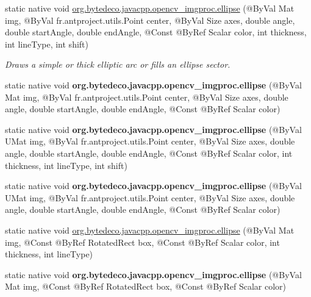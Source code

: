 \begin{DoxyCompactItemize}
\item 
static native void \hyperlink{group__imgproc__draw_ga775ad50d707d4e99bd6f123f702e55a2}{org.\+bytedeco.\+javacpp.\+opencv\+\_\+imgproc.\+ellipse} (@By\+Val Mat img, @By\+Val fr.antproject.utils.Point center, @By\+Val Size axes, double angle, double start\+Angle, double end\+Angle, @Const @By\+Ref Scalar color, int thickness, int line\+Type, int shift)
\begin{DoxyCompactList}\small\item\em Draws a simple or thick elliptic arc or fills an ellipse sector. \end{DoxyCompactList}\item 
\mbox{\label{group__imgproc__draw_gaf55397a8f53b47bedcf99d53034662e1}} 
static native void {\bfseries org.\+bytedeco.\+javacpp.\+opencv\+\_\+imgproc.\+ellipse} (@By\+Val Mat img, @By\+Val fr.antproject.utils.Point center, @By\+Val Size axes, double angle, double start\+Angle, double end\+Angle, @Const @By\+Ref Scalar color)
\item 
\mbox{\label{group__imgproc__draw_gaba0d700bcd539788f3d33f872ddc3fbf}} 
static native void {\bfseries org.\+bytedeco.\+javacpp.\+opencv\+\_\+imgproc.\+ellipse} (@By\+Val U\+Mat img, @By\+Val fr.antproject.utils.Point center, @By\+Val Size axes, double angle, double start\+Angle, double end\+Angle, @Const @By\+Ref Scalar color, int thickness, int line\+Type, int shift)
\item 
\mbox{\label{group__imgproc__draw_ga9a7de14f5273857bcb1023332bfe3178}} 
static native void {\bfseries org.\+bytedeco.\+javacpp.\+opencv\+\_\+imgproc.\+ellipse} (@By\+Val U\+Mat img, @By\+Val fr.antproject.utils.Point center, @By\+Val Size axes, double angle, double start\+Angle, double end\+Angle, @Const @By\+Ref Scalar color)
\item 
static native void \hyperlink{group__imgproc__draw_gad8f98cdfda176a2e4e1560740c6b5adb}{org.\+bytedeco.\+javacpp.\+opencv\+\_\+imgproc.\+ellipse} (@By\+Val Mat img, @Const @By\+Ref Rotated\+Rect box, @Const @By\+Ref Scalar color, int thickness, int line\+Type)
\item 
\mbox{\label{group__imgproc__draw_ga9eba26e909a6b1bff5d442d5fc3a09cf}} 
static native void {\bfseries org.\+bytedeco.\+javacpp.\+opencv\+\_\+imgproc.\+ellipse} (@By\+Val Mat img, @Const @By\+Ref Rotated\+Rect box, @Const @By\+Ref Scalar color)

\end{DoxyCompactItemize}
